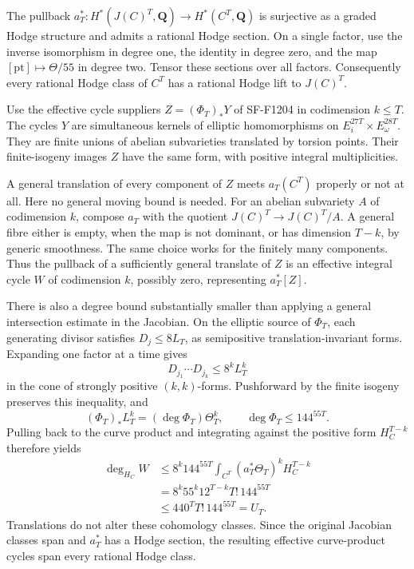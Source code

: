 The pullback \(a_T^*:H^*(J(C)^T,\mathbf Q)\to H^*(C^T,\mathbf Q)\) is
surjective as a graded Hodge structure and admits a rational Hodge
section. On a single factor, use the inverse isomorphism in degree one,
the identity in degree zero, and the map
\([\mathrm{pt}]\mapsto\Theta/55\) in degree two. Tensor these sections
over all factors. Consequently every rational Hodge class of \(C^T\) has
a rational Hodge lift to \(J(C)^T\).

Use the effective cycle suppliers \(Z=(\Phi_T)_*Y\) of SF-F1204 in
codimension \(k\le T\). The cycles \(Y\) are simultaneous kernels of
elliptic homomorphisms on \(E_i^{27T}\times E_\omega^{28T}\). They are
finite unions of abelian subvarieties translated by torsion points.
Their finite-isogeny images \(Z\) have the same form, with positive
integral multiplicities.

A general translation of every component of \(Z\) meets \(a_T(C^T)\)
properly or not at all. Here no general moving bound is needed. For an
abelian subvariety \(A\) of codimension \(k\), compose \(a_T\) with the
quotient \(J(C)^T\to J(C)^T/A\). A general fibre either is empty, when
the map is not dominant, or has dimension \(T-k\), by generic
smoothness. The same choice works for the finitely many components. Thus
the pullback of a sufficiently general translate of \(Z\) is an
effective integral cycle \(W\) of codimension \(k\), possibly zero,
representing \(a_T^*[Z]\).

There is also a degree bound substantially smaller than applying a
general intersection estimate in the Jacobian. On the elliptic source of
\(\Phi_T\), each generating divisor satisfies \(D_j\le8L_T\), as
semipositive translation-invariant forms. Expanding one factor at a time
gives \[
 D_{j_1}\cdots D_{j_k}\le8^kL_T^k
\] in the cone of strongly positive \((k,k)\)-forms. Pushforward by the
finite isogeny preserves this inequality, and \[
 (\Phi_T)_*L_T^k=(\deg\Phi_T)\Theta_T^k,\qquad
 \deg\Phi_T\le144^{55T}.
\] Pulling back to the curve product and integrating against the
positive form \(H_C^{T-k}\) therefore yields \[
 \begin{aligned}
 \deg_{H_C}W
 &\le8^k144^{55T}
       \int_{C^T}(a_T^*\Theta_T)^kH_C^{T-k}\\
 &=8^k55^k12^{T-k}T!\,144^{55T}\\
 &\le440^T T!\,144^{55T}=U_T.
 \end{aligned}
 \tag{SKQ.3}
\] Translations do not alter these cohomology classes. Since the
original Jacobian classes span and \(a_T^*\) has a Hodge section, the
resulting effective curve-product cycles span every rational Hodge
class.

